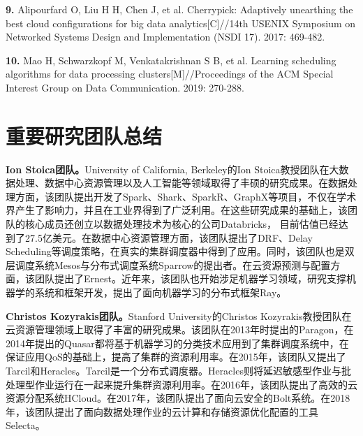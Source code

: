 \textbf{9. }Alipourfard O, Liu H H, Chen J, et al. Cherrypick: Adaptively unearthing the best cloud configurations for big data analytics[C]//14th {USENIX} Symposium on Networked Systems Design and Implementation ({NSDI} 17). 2017: 469-482.

\textbf{10. }Mao H, Schwarzkopf M, Venkatakrishnan S B, et al. Learning scheduling algorithms for data processing clusters[M]//Proceedings of the ACM Special Interest Group on Data Communication. 2019: 270-288.


\section{重要研究团队总结}
\textbf{Ion Stoica团队。}University of California, Berkeley的Ion Stoica教授团队在大数据处理、数据中心资源管理以及人工智能等领域取得了丰硕的研究成果。在数据处理方面，该团队提出开发了Spark、Shark、SparkR、GraphX等项目，不仅在学术界产生了影响力，并且在工业界得到了广泛利用。在这些研究成果的基础上，该团队的核心成员还创立以数据处理技术为核心的公司Databricks， 目前估值已经达到了27.5亿美元。在数据中心资源管理方面，该团队提出了DRF、Delay Scheduling等调度策略，在真实的集群调度器中得到了应用。同时，该团队也是双层调度系统Mesos与分布式调度系统Sparrow的提出者。在云资源预测与配置方面，该团队提出了Ernest。近年来，该团队也开始涉足机器学习领域，研究支撑机器学的系统和框架开发，提出了面向机器学习的分布式框架Ray。

\textbf{Christos Kozyrakis团队。}Stanford University的Christos Kozyrakis教授团队在云资源管理领域上取得了丰富的研究成果。该团队在2013年时提出的Paragon，在2014年提出的Quasar都将基于机器学习的分类技术应用到了集群调度系统中，在保证应用QoS的基础上，提高了集群的资源利用率。在2015年，该团队又提出了Tarcil和Heracles。Tarcil是一个分布式调度器。Heracles则将延迟敏感型作业与批处理型作业运行在一起来提升集群资源利用率。在2016年，该团队提出了高效的云资源分配系统HCloud。在2017年，该团队提出了面向云安全的Bolt系统。在2018年，该团队提出了面向数据处理作业的云计算和存储资源优化配置的工具Selecta。